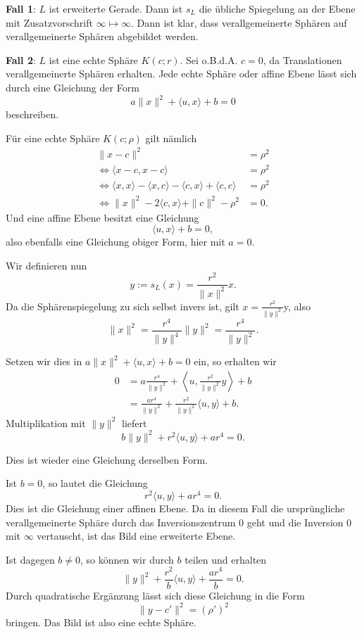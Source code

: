 \textbf{Fall 1}: $L$ ist erweiterte Gerade. Dann ist $s_L$ die übliche Spiegelung an der Ebene mit Zusatzvorschrift $\infty \mapsto \infty$.
Dann ist klar, dass verallgemeinerte Sphären auf verallgemeinerte Sphären abgebildet werden.

\textbf{Fall 2}: $L$ ist eine echte Sphäre $K(c;r)$. Sei o.B.d.A. $c = 0$, da Translationen verallgemeinerte Sphären erhalten.
Jede echte Sphäre oder affine Ebene lässt sich durch eine Gleichung der Form
\[
    a\|x\|^2+\langle u,x\rangle+b=0
\]
beschreiben.

Für eine echte Sphäre \(K(c;\rho)\) gilt nämlich
\begin{align*}
    \|x-c\|^2&=\rho^2\\
    \Longleftrightarrow \langle x-c, x-c\rangle &= \rho^2\\
    \Longleftrightarrow \langle x, x \rangle - \langle x, c \rangle - \langle c, x \rangle + \langle c, c \rangle &= \rho^2\\
    \Longleftrightarrow \|x\|^2-2\langle c,x\rangle+\|c\|^2-\rho^2&=0.
\end{align*}
Und eine affine Ebene besitzt eine Gleichung
\[
    \langle u,x\rangle+b=0,
\]
also ebenfalls eine Gleichung obiger Form, hier mit \(a=0\).


Wir definieren nun
\[
    y := s_L(x) = \frac{r^2}{\|x\|^2}x.
\]
Da die Sphärenspiegelung zu sich selbst invers ist, gilt \(x = \frac{r^2}{\|y\|^2}\)y, also
\[
    \|x\|^2 = \frac{r^4}{\|y\|^4}\|y\|^2=\frac{r^4}{\|y\|^2}.
\]

Setzen wir dies in \(a\|x\|^2+\langle u,x\rangle+b=0\)
ein, so erhalten wir
\begin{align*}
    0
    &=
    a\frac{r^4}{\|y\|^2}
    +
    \left\langle
        u,
        \frac{r^2}{\|y\|^2}y
    \right\rangle
    +b\\
    &=
    \frac{ar^4}{\|y\|^2}
    +
    \frac{r^2}{\|y\|^2}\langle u,y\rangle
    +b.
\end{align*}
Multiplikation mit \(\|y\|^2\) liefert
\[
    b\|y\|^2+r^2\langle u,y\rangle+ar^4=0.
\]

Dies ist wieder eine Gleichung derselben Form.

Ist \(b=0\), so lautet die Gleichung
\[
    r^2\langle u,y\rangle+ar^4=0.
\]
Dies ist die Gleichung einer affinen Ebene. Da in diesem Fall die ursprüngliche
verallgemeinerte Sphäre durch das Inversionszentrum \(0\) geht und die Inversion
\(0\) mit \(\infty\) vertauscht, ist das Bild eine erweiterte Ebene.

Ist dagegen \(b\neq0\), so können wir durch \(b\) teilen und erhalten
\[
    \|y\|^2+\frac{r^2}{b}\langle u,y\rangle+\frac{ar^4}{b}=0.
\]
Durch quadratische Ergänzung lässt sich diese Gleichung in die Form
\[
    \|y-c'\|^2=(\rho')^2
\]
bringen. Das Bild ist also eine echte Sphäre.

